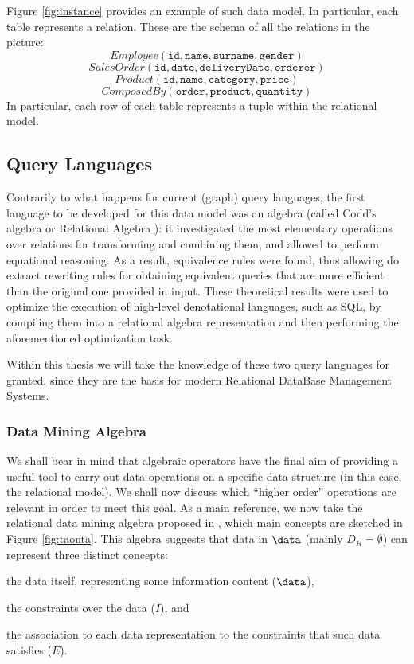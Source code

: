 \begin{example}
Figure \ref{fig:instance} provides an example of such data model. In particular, each table represents a relation. These are the schema of all the relations in the picture:
\[Employee(\underline{\texttt{id}},\texttt{name},\texttt{surname},\texttt{gender})\]
\[SalesOrder(\underline{\texttt{id}},\texttt{date},\texttt{deliveryDate},\texttt{orderer})\]
\[Product(\underline{\texttt{id}},\texttt{name},\texttt{category},\texttt{price})\]
\[ComposedBy(\texttt{order},\texttt{product},\texttt{quantity})\]
In particular, each row of each table represents a tuple within the relational model. 
\end{example}

\subsection{Query Languages}
Contrarily to what happens for current (graph) query languages, the first language to be developed for this data model was an algebra (called Codd's algebra or Relational Algebra \cite{atzeni,atzeniIT,Elmasri}): it investigated the most elementary operations over relations for transforming and combining them, and allowed to perform equational reasoning. As a result, equivalence rules were found, thus allowing do extract rewriting rules for obtaining equivalent queries that are more efficient than the original one provided in input. These theoretical results were used to optimize the execution of high-level denotational languages, such as SQL, by compiling them into a relational algebra representation and then performing the aforementioned optimization task.

Within this thesis we will take the knowledge of these two query languages for granted, since they are the basis for modern Relational DataBase Management Systems. %

\subsubsection{Data Mining Algebra}\label{subsec:dmalgebra}
We shall bear in mind that algebraic operators have the final aim of providing a useful tool to carry out data operations on a specific data structure (in this case, the relational model).   We shall now discuss which ``higher order'' operations are relevant in order to meet this goal. As a main reference, we now take the relational data mining algebra proposed in \cite{Calders2006}, which main concepts are sketched in Figure \ref{fig:taonta}. This algebra suggests that data in $\data$ (mainly $D_R=\emptyset$) can represent three distinct concepts: \begin{mylist}
	\item the data itself, representing some information content ($\data$),
	\item the constraints over the data ($I$), and
	\item the association to each data representation to the constraints that such data satisfies ($E$).
\end{mylist}

